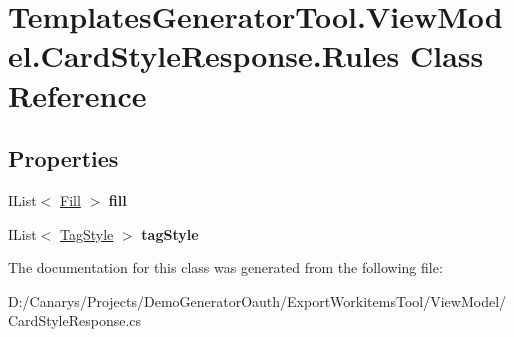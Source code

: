 \hypertarget{class_templates_generator_tool_1_1_view_model_1_1_card_style_response_1_1_rules}{}\section{Templates\+Generator\+Tool.\+View\+Model.\+Card\+Style\+Response.\+Rules Class Reference}
\label{class_templates_generator_tool_1_1_view_model_1_1_card_style_response_1_1_rules}
\subsection*{Properties}
\begin{DoxyCompactItemize}
\item 
\mbox{\label{class_templates_generator_tool_1_1_view_model_1_1_card_style_response_1_1_rules_ad10b9b14a9ab3bcffb4f497b8f2b4ffe}} 
I\+List$<$ \mbox{\hyperlink{class_templates_generator_tool_1_1_view_model_1_1_card_style_response_1_1_fill}{Fill}} $>$ {\bfseries fill}
\item 
\mbox{\label{class_templates_generator_tool_1_1_view_model_1_1_card_style_response_1_1_rules_a719e2c922ad66aa1d3fef0fe4ed23b43}} 
I\+List$<$ \mbox{\hyperlink{class_templates_generator_tool_1_1_view_model_1_1_card_style_response_1_1_tag_style}{Tag\+Style}} $>$ {\bfseries tag\+Style}
\end{DoxyCompactItemize}


The documentation for this class was generated from the following file\+:\begin{DoxyCompactItemize}
\item 
D\+:/\+Canarys/\+Projects/\+Demo\+Generator\+Oauth/\+Export\+Workitems\+Tool/\+View\+Model/Card\+Style\+Response.\+cs\end{DoxyCompactItemize}
